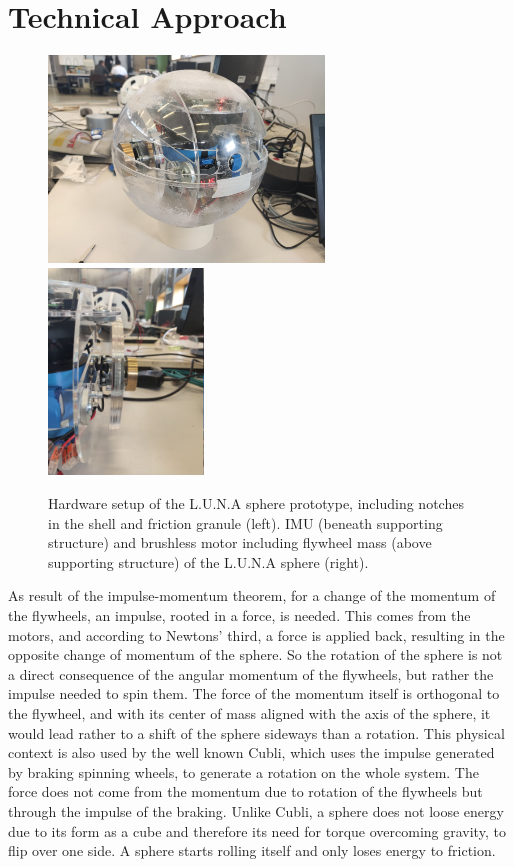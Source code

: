 \section{Technical Approach}
\label{sec:TechnicalApproach}

\begin{figure}
\centering
\includegraphics[height=55mm]{../Media/sphereFullshellLeft.jpg}
\hfill
\includegraphics[height=55mm]{../Media/sphereRightMotor.jpg}   
\caption{Hardware setup of the L.U.N.A sphere prototype, including notches in the shell and friction granule (left). IMU (beneath supporting structure) and brushless motor  including flywheel mass (above supporting structure) of the L.U.N.A sphere (right).}
\label{sec:TechnicalApproach:fig:setup}
\end{figure}


As result of the impulse-momentum theorem, for a change of the momentum of the flywheels, an impulse, rooted in a force, is needed. 
This comes from the motors, and according to Newtons' third, a force is applied back, resulting in the opposite change of momentum of the sphere. 
So the rotation of the sphere is not a direct consequence of the angular momentum of the flywheels, but rather the impulse needed to spin them. 
The force of the momentum itself is orthogonal to the flywheel, and with its center of mass aligned with the axis of the sphere, it would lead rather to a shift of the sphere sideways than a rotation. 
This physical context is also used by the well known Cubli, which uses the impulse generated by braking spinning wheels, to generate a rotation on the whole system. The force does not come from the momentum due to rotation of the flywheels but through the impulse of the braking.
Unlike Cubli, a sphere does not loose energy due to its form as a cube and therefore its need for torque overcoming gravity, to flip over one side. 
A sphere starts rolling itself and only loses energy to friction.


